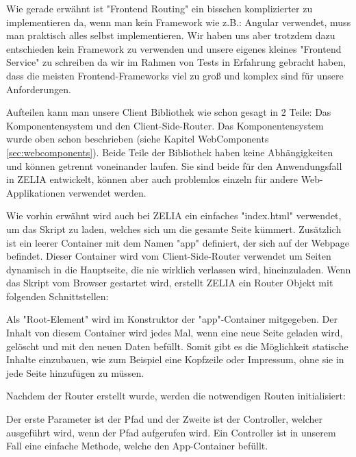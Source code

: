 
Wie gerade erwähnt ist "Frontend Routing" ein bisschen komplizierter zu implementieren da, wenn man kein Framework wie z.B.: Angular verwendet, muss man praktisch alles selbst implementieren. Wir haben uns aber trotzdem dazu entschieden kein Framework zu verwenden und unsere eigenes kleines "Frontend Service" zu schreiben da wir im Rahmen von Tests  in Erfahrung gebracht haben, dass die meisten Frontend-Frameworks viel zu groß und komplex sind für unsere Anforderungen.

Aufteilen kann man unsere Client Bibliothek wie schon gesagt in 2 Teile: Das Komponentensystem und den Client-Side-Router. Das Komponentensystem wurde oben schon beschrieben (siehe Kapitel WebComponents \ref{sec:webcomponents}). Beide Teile der Bibliothek haben keine Abhängigkeiten und können getrennt voneinander laufen. Sie sind beide für den Anwendungsfall in ZELIA entwickelt, können aber auch problemlos einzeln für andere Web-Applikationen verwendet werden.

Wie vorhin erwähnt wird auch bei ZELIA ein einfaches "index.html" verwendet, um das Skript zu laden, welches sich um die gesamte Seite kümmert. Zusätzlich ist ein leerer Container mit dem Namen "app" definiert, der sich auf der Webpage befindet. Dieser Container wird vom Client-Side-Router verwendet um Seiten dynamisch in die Hauptseite, die nie wirklich verlassen wird, hineinzuladen. Wenn das Skript vom Browser gestartet wird, erstellt ZELIA ein Router Objekt mit folgenden Schnittstellen:


Als "Root-Element" wird im Konstruktor der "app"-Container mitgegeben. Der Inhalt von diesem Container wird jedes Mal, wenn eine neue Seite geladen wird, gelöscht und mit den neuen Daten befüllt. Somit gibt es die Möglichkeit statische Inhalte einzubauen, wie zum Beispiel eine Kopfzeile oder Impressum, ohne sie in jede Seite hinzufügen zu müssen.

Nachdem der Router erstellt wurde, werden die notwendigen Routen initialisiert:



Der erste Parameter ist der Pfad und der Zweite ist der Controller, welcher ausgeführt wird, wenn der Pfad aufgerufen wird. Ein Controller ist in unserem Fall eine einfache Methode, welche den App-Container befüllt.

